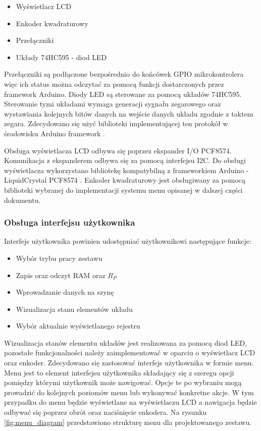 \documentclass[../main.tex]{subfiles}
\begin{document}
    \begin{itemize}
        \item Wyświetlacz LCD
        \item Enkoder kwadraturowy
        \item Przełączniki
        \item Układy 74HC595 - diod LED
    \end{itemize}
    Przełączniki są podłączone bezpośrednio do końcówek GPIO mikrokontrolera więc ich status można odczytać za pomocą funkcji
    dostarczonych przez framework Arduino. Diody LED są sterowane za pomocą układów 74HC595. Sterowanie tymi układami wymaga 
    generacji sygnału zegarowego oraz wystawiania kolejnych bitów danych na wejście danych układu zgodnie z taktem zegara.
    Zdecydowano się użyć biblioteki implementującej ten protokół w środowisku Arduino framework \cite{arduino_74hc595}.
    \par
    Obsługa wyświetlacza LCD odbywa się poprzez ekspander I/O PCF8574. Komunikacja z ekspanderem odbywa się za pomocą interfejsu I2C.
    Do obsługi wyświetlacza wykorzystano bibliotekę kompatybilną z frameworkiem Arduino - LiquidCrystal PCF8574 \cite{lcd_pcf8574}. 
    Enkoder kwadraturowy jest obsługiwany za pomocą biblioteki wybranej do implementacji systemu menu opisanej w dalszej części dokumentu.

    \subsubsection{Obsługa interfejsu użytkownika}
    Interfejs użytkownika powinien udostępniać użytkownikowi następujące funkcje:
    \begin{itemize}
        \item Wybór trybu pracy zestawu
        \item Zapis oraz odczyt RAM oraz $R_P$
        \item Wprowadzanie danych na szynę
        \item Wizualizacja stanu elementów układu
        \item Wybór aktualnie wyświetlanego rejestru
    \end{itemize}
    Wizualizacja stanów elementu układów jest realizowana za pomocą diod LED, pozostałe funkcjonalności należy zaimplementować w oparciu
    o wyświetlacz LCD oraz enkoder. Zdecydowano się  zastosować interfejs użytkownika w formie menu. Menu jest to element interfejsu 
    użytkownika składający się z szeregu opcji pomiędzy 
    którymi użytkownik może nawigować. Opcje te po wybraniu mogą prowadzić do kolejnych poziomów menu lub wykonywać konkretne akcje.
    W tym przypadku do menu będzie wyświetlane na wyświetlaczu LCD a nawigacja będzie odbywać się poprzez obrót oraz naciśnięcie enkodera.
    Na rysunku \ref{fig:menu_diagram} przedstawiono strukturę menu dla projektowanego zestawu.
\end{document}
